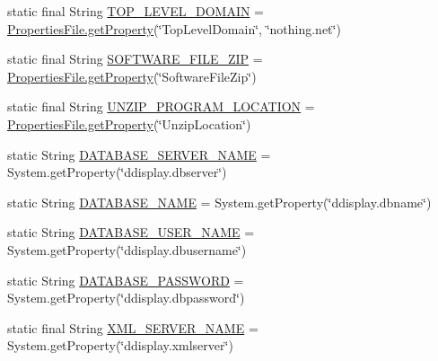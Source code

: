 \begin{DoxyCompactItemize}
\item 
static final String \hyperlink{classgov_1_1fnal_1_1ppd_1_1dd_1_1GlobalVariables_ad0a782cf8410f087e2bacb776ff69ca1}{T\-O\-P\-\_\-\-L\-E\-V\-E\-L\-\_\-\-D\-O\-M\-A\-I\-N} = \hyperlink{classgov_1_1fnal_1_1ppd_1_1dd_1_1util_1_1nonguiUtils_1_1PropertiesFile_ad3e5ac77723df18cb845643e3e219f49}{Properties\-File.\-get\-Property}(\char`\"{}Top\-Level\-Domain\char`\"{}, \char`\"{}nothing.\-net\char`\"{})
\item 
static final String \hyperlink{classgov_1_1fnal_1_1ppd_1_1dd_1_1GlobalVariables_ab8e56e6480b2c30248d2e20aee782cb4}{S\-O\-F\-T\-W\-A\-R\-E\-\_\-\-F\-I\-L\-E\-\_\-\-Z\-I\-P} = \hyperlink{classgov_1_1fnal_1_1ppd_1_1dd_1_1util_1_1nonguiUtils_1_1PropertiesFile_ad3e5ac77723df18cb845643e3e219f49}{Properties\-File.\-get\-Property}(\char`\"{}Software\-File\-Zip\char`\"{})
\item 
static final String \hyperlink{classgov_1_1fnal_1_1ppd_1_1dd_1_1GlobalVariables_a3b3484a9eaa4099af2a1ade1fa0f94a5}{U\-N\-Z\-I\-P\-\_\-\-P\-R\-O\-G\-R\-A\-M\-\_\-\-L\-O\-C\-A\-T\-I\-O\-N} = \hyperlink{classgov_1_1fnal_1_1ppd_1_1dd_1_1util_1_1nonguiUtils_1_1PropertiesFile_ad3e5ac77723df18cb845643e3e219f49}{Properties\-File.\-get\-Property}(\char`\"{}Unzip\-Location\char`\"{})
\item 
static String \hyperlink{classgov_1_1fnal_1_1ppd_1_1dd_1_1GlobalVariables_a84bb07dcee9c961579282f50a5031c0e}{D\-A\-T\-A\-B\-A\-S\-E\-\_\-\-S\-E\-R\-V\-E\-R\-\_\-\-N\-A\-M\-E} = System.\-get\-Property(\char`\"{}ddisplay.\-dbserver\char`\"{})
\item 
static String \hyperlink{classgov_1_1fnal_1_1ppd_1_1dd_1_1GlobalVariables_a737045676a15c469e5cb486d80c08043}{D\-A\-T\-A\-B\-A\-S\-E\-\_\-\-N\-A\-M\-E} = System.\-get\-Property(\char`\"{}ddisplay.\-dbname\char`\"{})
\item 
static String \hyperlink{classgov_1_1fnal_1_1ppd_1_1dd_1_1GlobalVariables_a1b5c1519d1964bf42b3fe4908ae6d444}{D\-A\-T\-A\-B\-A\-S\-E\-\_\-\-U\-S\-E\-R\-\_\-\-N\-A\-M\-E} = System.\-get\-Property(\char`\"{}ddisplay.\-dbusername\char`\"{})
\item 
static String \hyperlink{classgov_1_1fnal_1_1ppd_1_1dd_1_1GlobalVariables_ae63bd973c9c02683b0c4964179ceefe0}{D\-A\-T\-A\-B\-A\-S\-E\-\_\-\-P\-A\-S\-S\-W\-O\-R\-D} = System.\-get\-Property(\char`\"{}ddisplay.\-dbpassword\char`\"{})
\item 
static final String \hyperlink{classgov_1_1fnal_1_1ppd_1_1dd_1_1GlobalVariables_a1b1eb1c9096380d09b968cd474e8bb86}{X\-M\-L\-\_\-\-S\-E\-R\-V\-E\-R\-\_\-\-N\-A\-M\-E} = System.\-get\-Property(\char`\"{}ddisplay.\-xmlserver\char`\"{})

\end{DoxyCompactItemize}
